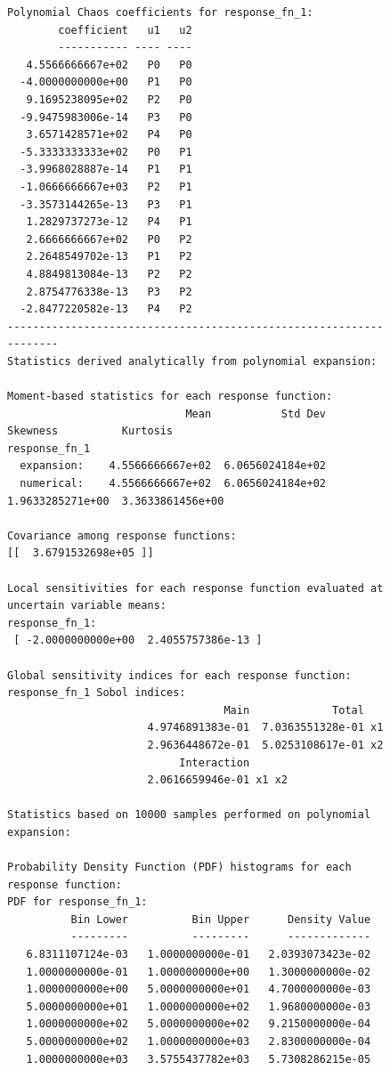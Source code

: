 \begin{figure}[htbp!]
\centering
\begin{bigbox}
\begin{scriptsize}
\begin{verbatim}
Polynomial Chaos coefficients for response_fn_1:
        coefficient   u1   u2
        ----------- ---- ----
   4.5566666667e+02   P0   P0
  -4.0000000000e+00   P1   P0
   9.1695238095e+02   P2   P0
  -9.9475983006e-14   P3   P0
   3.6571428571e+02   P4   P0
  -5.3333333333e+02   P0   P1
  -3.9968028887e-14   P1   P1
  -1.0666666667e+03   P2   P1
  -3.3573144265e-13   P3   P1
   1.2829737273e-12   P4   P1
   2.6666666667e+02   P0   P2
   2.2648549702e-13   P1   P2
   4.8849813084e-13   P2   P2
   2.8754776338e-13   P3   P2
  -2.8477220582e-13   P4   P2
-------------------------------------------------------------------
Statistics derived analytically from polynomial expansion:

Moment-based statistics for each response function:
                            Mean           Std Dev          Skewness          Kurtosis
response_fn_1
  expansion:    4.5566666667e+02  6.0656024184e+02
  numerical:    4.5566666667e+02  6.0656024184e+02  1.9633285271e+00  3.3633861456e+00

Covariance among response functions:
[[  3.6791532698e+05 ]] 

Local sensitivities for each response function evaluated at uncertain variable means:
response_fn_1:
 [ -2.0000000000e+00  2.4055757386e-13 ] 

Global sensitivity indices for each response function:
response_fn_1 Sobol indices:
                                  Main             Total
                      4.9746891383e-01  7.0363551328e-01 x1
                      2.9636448672e-01  5.0253108617e-01 x2
                           Interaction
                      2.0616659946e-01 x1 x2 

Statistics based on 10000 samples performed on polynomial expansion:

Probability Density Function (PDF) histograms for each response function:
PDF for response_fn_1:
          Bin Lower          Bin Upper      Density Value
          ---------          ---------      -------------
   6.8311107124e-03   1.0000000000e-01   2.0393073423e-02
   1.0000000000e-01   1.0000000000e+00   1.3000000000e-02
   1.0000000000e+00   5.0000000000e+01   4.7000000000e-03
   5.0000000000e+01   1.0000000000e+02   1.9680000000e-03
   1.0000000000e+02   5.0000000000e+02   9.2150000000e-04
   5.0000000000e+02   1.0000000000e+03   2.8300000000e-04
   1.0000000000e+03   3.5755437782e+03   5.7308286215e-05


\end{verbatim}
\end{scriptsize}
\end{bigbox}
\end{figure}
